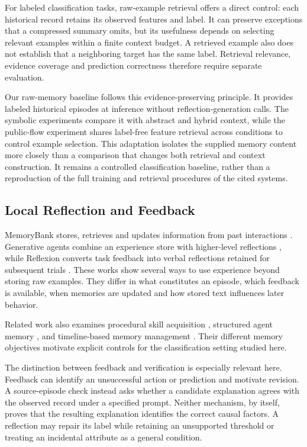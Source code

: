 \documentclass[journal]{IEEEtran}
\theoremstyle{definition}
\theoremstyle{remark}
\begin{document}
For labeled classification tasks, raw-example retrieval offers a direct control: each historical record retains its observed features and label. It can preserve exceptions that a compressed summary omits, but its usefulness depends on selecting relevant examples within a finite context budget. A retrieved example also does not establish that a neighboring target has the same label. Retrieval relevance, evidence coverage and prediction correctness therefore require separate evaluation.

Our raw-memory baseline follows this evidence-preserving principle. It provides labeled historical episodes at inference without reflection-generation calls. The symbolic experiments compare it with abstract and hybrid context, while the public-flow experiment shares label-free feature retrieval across conditions to control example selection. This adaptation isolates the supplied memory content more closely than a comparison that changes both retrieval and context construction. It remains a controlled classification baseline, rather than a reproduction of the full training and retrieval procedures of the cited systems.

\subsection{Local Reflection and Feedback}
MemoryBank stores, retrieves and updates information from past interactions \cite{zhong2024memorybank}. Generative agents combine an experience store with higher-level reflections \cite{park2023generative}, while Reflexion converts task feedback into verbal reflections retained for subsequent trials \cite{shinn2023reflexion}. These works show several ways to use experience beyond storing raw examples. They differ in what constitutes an episode, which feedback is available, when memories are updated and how stored text influences later behavior.

Related work also examines procedural skill acquisition \cite{wang2024voyager}, structured agent memory \cite{xu2025amem}, and timeline-based memory management \cite{kim2024towards}. Their different memory objectives motivate explicit controls for the classification setting studied here.

The distinction between feedback and verification is especially relevant here. Feedback can identify an unsuccessful action or prediction and motivate revision. A source-episode check instead asks whether a candidate explanation agrees with the observed record under a specified prompt. Neither mechanism, by itself, proves that the resulting explanation identifies the correct causal factors. A reflection may repair its label while retaining an unsupported threshold or treating an incidental attribute as a general condition.
\end{document}
